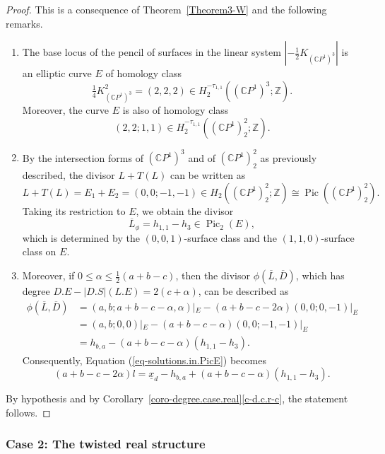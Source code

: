 \documentclass[11pt]{amsart}
\numberwithin{equation}{section}
\theoremstyle{definition}
\theoremstyle{plain}
\theoremstyle{remark}
\newcommand{\Z}{\mathbb{Z}}
\newcommand{\C}{\mathbb{C}}
\DeclareMathOperator{\Pic}{Pic}
\begin{document}
\begin{proof}
This is a consequence of Theorem~\ref{Theorem3-W}  
    and the following remarks.
    \begin{enumerate}
        \item The base locus of the pencil of surfaces in the linear system $|-\frac{1}{2}K_{(\C P^1)^3}|$ is an elliptic curve $E$ of homology class 
        $$\tfrac{1}{4}K_{(\C P^1)^3}^2=(2,2,2)\in H_2^{-{\tau}_{1,1}}\left(\left(\C P^1\right)^3;\Z\right).$$
        Moreover, the curve $E$ is also of homology class 
        $$(2,2;1,1)\in  H_2^{-{\tau}_{1,1}}\left(\left(\C P^1\right)^2_2;\Z\right).$$
      \item By the intersection forms of $(\C P^1)^3$ and of $(\C P^1)^2_2$ as previously described,  the divisor $L+T(L)$ can be written as
        $$L+T(L)=E_1+E_2=(0,0;-1,-1)\in H_2\left(\left(\C P^1\right)^2_2;\Z\right)\cong \Pic\left(\left(\C P^1\right)^2_2\right).$$ 
        Taking its restriction to $E$,  we obtain the divisor
        $$\overline{L}_{\phi}=h_{1,1}-h_3 \in \Pic_2(E),$$
        which is determined by the $(0,0,1)$-surface class  and the  $(1,1,0)$-surface class on $E$.
        \item Moreover, if $0\leq \alpha\leq \frac{1}{2}(a+b-c)$, then the divisor $\phi(\overline{L},\overline{D})$, which has degree $D.E-|D.S|(L.E)= 2(c+\alpha)$, can be described as
        \begin{align*}
            \phi\left(\overline{L},\overline{D}\right)&=(a,b;a+b-c-\alpha,\alpha)|_E-(a+b-c-2\alpha)(0,0;0,-1)|_E\\
           & =(a,b;0,0)|_E-(a+b-c-\alpha) (0,0;-1,-1)|_E\\
           & = h_{b,a}-(a+b-c-\alpha)(h_{1,1}-h_3).
        \end{align*} 
            Consequently, Equation (\ref{eq-solutions.in.PicE}) becomes
\begin{equation}
     (a+b-c-2\alpha)l=\underline{x}_{d}-h_{b,a}+(a+b-c-\alpha)(h_{1,1}-h_3).
\end{equation}
    \end{enumerate}

    By hypothesis and by Corollary~\ref{coro-degree.case.real}\eqref{c-d.c.r-c}, the statement follows.
\end{proof}


\subsubsection*{Case 2: The twisted real structure}
  
\end{document}

